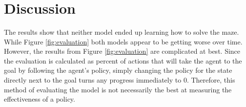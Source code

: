 \documentclass[12pt]{article}
\begin{document}
%
%



%
%
%
%

\section{Discussion}

% 


\paragraph{}
The results show that neither model ended up learning how to solve the maze. 
While Figure \ref{fig:evaluation} both models appear to be getting worse over time.
However, the results from Figure \ref{fig:evaluation} are complicated at best.
Since the evaluation is calculated as percent of actions that will take the agent to the goal by following the agent's policy, simply changing the policy for the state directly next to the goal turns any progress immediately to 0.
Therefore, this method of evaluating the model is not necessarily the best at measuring the effectiveness of a policy.
\end{document}
